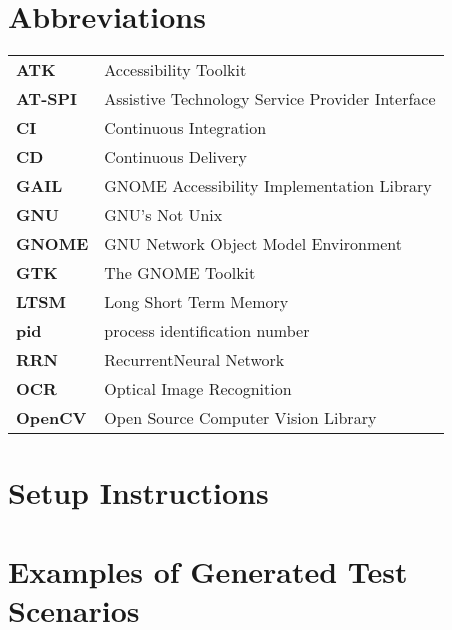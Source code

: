 
\chapter{Abbreviations}
\renewcommand{\arraystretch}{1.2}
\begin{tabular}{lp{12cm}}%
\textbf{ATK} & Accessibility Toolkit \\
\textbf{AT-SPI} & Assistive Technology Service Provider Interface \\
\textbf{CI} & Continuous Integration \\
\textbf{CD} & Continuous Delivery \\
\textbf{GAIL} & GNOME Accessibility Implementation Library \\
\textbf{GNU} & GNU's Not Unix \\
\textbf{GNOME} & GNU Network Object Model Environment \\
\textbf{GTK} & The GNOME Toolkit \\
\textbf{LTSM} & Long Short Term Memory \\
\textbf{pid} & process identification number \\
\textbf{RRN} & RecurrentNeural Network \\
\textbf{OCR} & Optical Image Recognition \\
\textbf{OpenCV} & Open Source Computer Vision Library \\
\end{tabular}


\chapter{Setup Instructions}


\chapter{Examples of Generated Test Scenarios}




